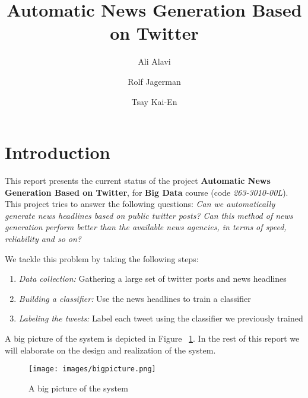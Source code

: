 \documentclass{llncs}
\begin{document}
%
\mainmatter              %
\pagestyle{headings}

%
\title{Automatic News Generation Based on Twitter}
%
%
\author{Ali Alavi \and Rolf Jagerman \and
Tsay Kai-En}
%
%
%

\maketitle              %
%
\section{Introduction}
%
This report presents the current status of the project \textbf{Automatic News Generation Based on Twitter}, 
for \textbf{Big Data} course (code \textit{263-3010-00L}). This project tries to answer the following questions: 
\textit{Can we automatically generate news headlines based on public twitter posts? Can this method of news generation 
perform better than the available news agencies, in terms of speed, reliability and so on?}

We tackle this problem by taking the following steps:

\begin{enumerate}
  \item \textit{Data collection: }Gathering a large set of twitter posts and news headlines 
  \item \textit{Building a classifier: }Use the news headlines to train a classifier
  \item \textit{Labeling the tweets: }Label each tweet using the classifier we previously trained
\end{enumerate}

A big picture of the system is depicted in Figure ~\ref{fig:A big picture of the system}. In the rest of this report we will elaborate on the design and realization of the system.

\begin{figure}[H]
  \centering
  \texttt{[image: images/bigpicture.png]} 
  \caption{A big picture of the system}
  \label{fig:A big picture of the system}
\end{figure}
\end{document}
